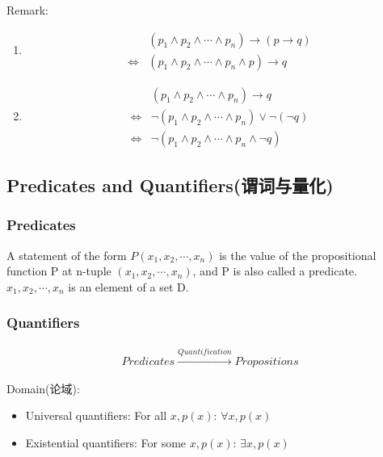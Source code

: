Remark: 
\begin{enumerate}
    \item \begin{align*}
        &(p_1\land p_2 \land \cdots \land p_n)\longrightarrow (p\rightarrow q)\\
        \Longleftrightarrow &(p_1\land p_2 \land \cdots \land p_n\land p)\longrightarrow q
    \end{align*}
    \item \begin{align*}
        &(p_1\land p_2 \land \cdots \land p_n)\longrightarrow q\\
        \Longleftrightarrow&\neg (p_1\land p_2 \land \cdots \land p_n) \lor \neg(\neg q)\\
        \Longleftrightarrow& \neg (p_1\land p_2 \land \cdots \land p_n \land \neg q)
    \end{align*}
\end{enumerate}

\subsection{Predicates and Quantifiers(谓词与量化)}

\subsubsection{Predicates}
\begin{definition}
    A statement of the form $P(x_1,x_2,\cdots,x_n)$ is the value of the \textcolor{light_red}{propositional function} P at n-tuple $(x_1,x_2,\cdots,x_n)$, and P is also called a \textcolor{light_red}{predicate}. \\
    $x_1,x_2,\cdots,x_n$ is an element of a set D. 
\end{definition}

\subsubsection{Quantifiers}
\begin{align*}
    Predicates  \xrightarrow{Quantification} Propositions 
\end{align*}

Domain(论域):
\begin{itemize}
    \item Universal quantifiers: For all $x, p(x)$: $\forall x, p(x)$
    \item Existential quantifiers: For some $x,p(x)$: $\exists x, p(x)$
\end{itemize}

